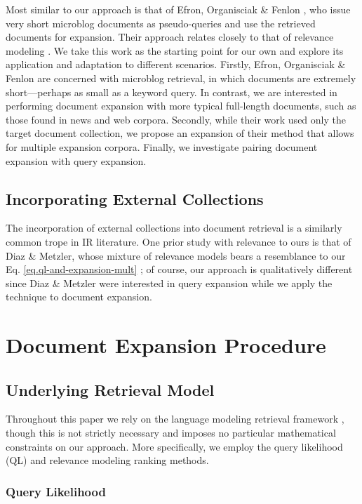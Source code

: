 \documentclass{article}
\begin{document}
Most similar to our approach is that of Efron, Organisciak \& Fenlon \cite{Efron2012}, who issue very short microblog documents as pseudo-queries and use the retrieved documents for expansion. Their approach relates closely to that of relevance modeling \cite{Lavrenko2001}. We take this work as the starting point for our own and explore its application and adaptation to different scenarios. Firstly, Efron, Organisciak \& Fenlon are concerned with microblog retrieval, in which documents are extremely short---perhaps as small as a keyword query. In contrast, we are interested in performing document expansion with more typical full-length documents, such as those found in news and web corpora. Secondly, while their work used only the target document collection, we propose an expansion of their method that allows for multiple expansion corpora. Finally, we investigate pairing document expansion with query expansion.

\subsection{Incorporating External Collections}\label{section.external.collections}

The incorporation of external collections into document retrieval is a similarly common trope in IR literature. One prior study with relevance to ours is that of Diaz \& Metzler, whose mixture of relevance models bears a resemblance to our Eq. \ref{eq.ql-and-expansion-mult} \cite{Diaz2006}; of course, our approach is qualitatively different since Diaz \& Metzler were interested in query expansion while we apply the technique to document expansion.

\section{Document Expansion Procedure}\label{section.expanding}

\subsection{Underlying Retrieval Model}\label{section.expanding.model}
Throughout this paper we rely on the language modeling retrieval framework \cite{Lafferty2001}, though this is not strictly necessary and imposes no particular mathematical constraints on our approach. More specifically, we employ the query likelihood (QL) and relevance modeling ranking methods. 

\subsubsection{Query Likelihood}\label{section.expanding.model.ql}
\end{document}
